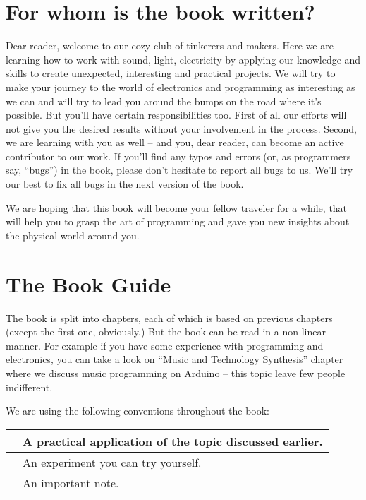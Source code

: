 \documentclass[../sparc.tex]{subfiles}
\begin{document}
\section*{For whom is the book written?}

Dear reader, welcome to our cozy club of tinkerers and makers.  Here we are
learning how to work with sound, light, electricity by applying our knowledge
and skills to create unexpected, interesting and practical projects.  We will
try to make your journey to the world of electronics and programming as
interesting as we can and will try to lead you around the bumps on the road
where it's possible.  But you'll have certain responsibilities too.  First of
all our efforts will not give you the desired results without your involvement
in the process.  Second, we are learning with you as well -- and you, dear
reader, can become an active contributor to our work.  If you'll find any typos
and errors (or, as programmers say, ``bugs'') in the book, please don't hesitate
to report all bugs to us.  We'll try our best to fix all bugs in the next
version of the book.

We are hoping that this book will become your fellow traveler for a while, that
will help you to grasp the art of programming and gave you new insights about
the physical world around you.

\section*{The Book Guide}

The book is split into chapters, each of which is based on previous chapters
(except the first one, obviously.)  But the book can be read in a non-linear
manner.  For example if you have some experience with programming and
electronics, you can take a look on ``Music and Technology Synthesis'' chapter
where we discuss music programming on Arduino -- this topic leave few people
indifferent.

We are using the following conventions throughout the book:

\begin{table}[H]
  \centering
  \def\arraystretch{3.0}%
  \begin{tabular}{|m{4em}|m{15em}|}
    \hline
    
    & A practical application of the topic discussed earlier. \\
    \hline
    
    & An experiment you can try yourself. \\
    \hline
    
    & An important note. \\
    \hline
  \end{tabular}
\end{table}
\end{document}
